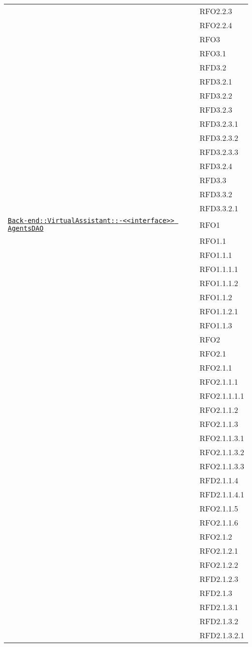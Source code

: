 \begin{longtable}{|>{\centering}m{10cm}|m{3cm}<{\centering}|}
& RFO2.2.3\\
& RFO2.2.4\\
& RFO3\\
& RFO3.1\\
& RFD3.2\\
& RFD3.2.1\\
& RFD3.2.2\\
& RFD3.2.3\\
& RFD3.2.3.1\\
& RFD3.2.3.2\\
& RFD3.2.3.3\\
& RFD3.2.4\\
& RFD3.3\\
& RFD3.3.2\\
& RFD3.3.2.1\\ \hline

\hyperref[Back-end::VirtualAssistant::<<interface>> AgentsDAO]{\texttt{Back-end::VirtualAssistant::-\linebreak <<interface>> AgentsDAO}} & RFO1\\
& RFO1.1\\
& RFO1.1.1\\
& RFO1.1.1.1\\
& RFO1.1.1.2\\
& RFO1.1.2\\
& RFO1.1.2.1\\
& RFO1.1.3\\
& RFO2\\
& RFO2.1\\
& RFO2.1.1\\
& RFO2.1.1.1\\
& RFO2.1.1.1.1\\
& RFO2.1.1.2\\
& RFO2.1.1.3\\
& RFO2.1.1.3.1\\
& RFO2.1.1.3.2\\
& RFO2.1.1.3.3\\
& RFD2.1.1.4\\
& RFD2.1.1.4.1\\
& RFO2.1.1.5\\
& RFO2.1.1.6\\
& RFO2.1.2\\
& RFO2.1.2.1\\
& RFO2.1.2.2\\
& RFD2.1.2.3\\
& RFD2.1.3\\
& RFD2.1.3.1\\
& RFD2.1.3.2\\
& RFD2.1.3.2.1\\

\end{longtable}
